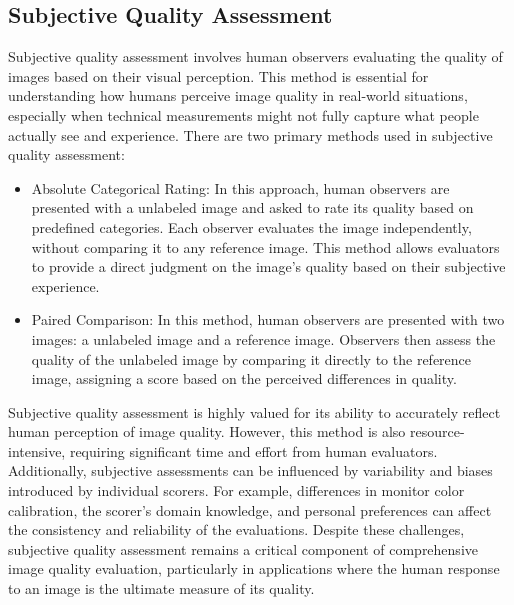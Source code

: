 \subsection{Subjective Quality Assessment}
\label{sub:SubjectiveQualityAssessment}
Subjective quality assessment involves human observers evaluating the quality of images based on their visual perception. This method is essential for understanding how humans perceive image quality in real-world situations, especially when technical measurements might not fully capture what people actually see and experience. There are two primary methods used in subjective quality assessment:\par
\begin{itemize}
    \item Absolute Categorical Rating:  In this approach, human observers are presented with a unlabeled image and asked to rate its quality based on predefined categories. Each observer evaluates the image independently, without comparing it to any reference image. This method allows evaluators to provide a direct judgment on the image’s quality based on their subjective experience.
    \item Paired Comparison:  In this method, human observers are presented with two images: a unlabeled image and a reference image. Observers then assess the quality of the unlabeled image by comparing it directly to the reference image, assigning a score based on the perceived differences in quality.
\end{itemize}
Subjective quality assessment is highly valued for its ability to accurately reflect human perception of image quality. However, this method is also resource-intensive, requiring significant time and effort from human evaluators. Additionally, subjective assessments can be influenced by variability and biases introduced by individual scorers. For example, differences in monitor color calibration, the scorer’s domain knowledge, and personal preferences can affect the consistency and reliability of the evaluations. Despite these challenges, subjective quality assessment remains a critical component of comprehensive image quality evaluation, particularly in applications where the human response to an image is the ultimate measure of its quality. \par

